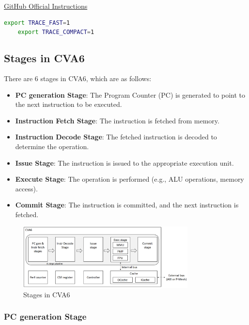 \documentclass[12pt, a4paper]{article}
\begin{document}
\href{https://github.com/openhwgroup/cva6/blob/e34c5ba68358b26dfe13d0b953e622f2e9f8bebd/tutorials/running_sim.md?plain=1#L91-L123}{GitHub Official Instructions}

\begin{lstlisting}[language=bash, frame=single, basicstyle=\ttfamily\footnotesize, numbers = none]
    export TRACE_FAST=1
    export TRACE_COMPACT=1
\end{lstlisting}

\subsection{Stages in CVA6}

There are 6 stages in CVA6, which are as follows:

\begin{itemize}
    \item \textbf{PC generation Stage}: The Program Counter (PC) is generated to point to the next instruction to be executed.
    \item \textbf{Instruction Fetch Stage}: The instruction is fetched from memory.
    \item \textbf{Instruction Decode Stage}: The fetched instruction is decoded to determine the operation.
    \item \textbf{Issue Stage}: The instruction is issued to the appropriate execution unit.
    \item \textbf{Execute Stage}: The operation is performed (e.g., ALU operations, memory access).
    \item \textbf{Commit Stage}: The instruction is committed, and the next instruction is fetched.
\end{itemize}

\begin{figure}[h]
    \centering
    \includegraphics[width=0.8\textwidth]{CVA6_Stages.png}
    \caption{Stages in CVA6}
    \label{fig:cva6_stages}
\end{figure}

\subsubsection{PC generation Stage}
\end{document}
